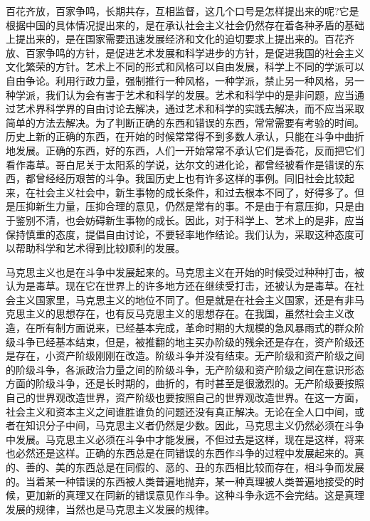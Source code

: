 \documentclass[UTF8, 12pt, a4paper]{ctexrep}
\begin{document}
百花齐放，百家争鸣，长期共存，互相监督，这几个口号是怎样提出来的呢?它是根据中国的具体情况提出来的，是在承认社会主义社会仍然存在着各种矛盾的基础上提出来的，是在国家需要迅速发展经济和文化的迫切要求上提出来的。百花齐放、百家争鸣的方针，是促进艺术发展和科学进步的方针，是促进我国的社会主义文化繁荣的方针。艺术上不同的形式和风格可以自由发展，科学上不同的学派可以自由争论。利用行政力量，强制推行一种风格，一种学派，禁止另一种风格，另一种学派，我们认为会有害于艺术和科学的发展。艺术和科学中的是非问题，应当通过艺术界科学界的自由讨论去解决，通过艺术和科学的实践去解决，而不应当采取简单的方法去解决。为了判断正确的东西和错误的东西，常常需要有考验的时间。历史上新的正确的东西，在开始的时候常常得不到多数人承认，只能在斗争中曲折地发展。正确的东西，好的东西，人们一开始常常不承认它们是香花，反而把它们看作毒草。哥白尼关于太阳系的学说，达尔文的进化论，都曾经被看作是错误的东西，都曾经经历艰苦的斗争。我国历史上也有许多这样的事例。同旧社会比较起来，在社会主义社会中，新生事物的成长条件，和过去根本不同了，好得多了。但是压抑新生力量，压抑合理的意见，仍然是常有的事。不是由于有意压抑，只是由于鉴别不清，也会妨碍新生事物的成长。因此，对于科学上、艺术上的是非，应当保持慎重的态度，提倡自由讨论，不要轻率地作结论。我们认为，采取这种态度可以帮助科学和艺术得到比较顺利的发展。

马克思主义也是在斗争中发展起来的。马克思主义在开始的时候受过种种打击，被认为是毒草。现在它在世界上的许多地方还在继续受打击，还被认为是毒草。在社会主义国家里，马克思主义的地位不同了。但是就是在社会主义国家，还是有非马克思主义的思想存在，也有反马克思主义的思想存在。在我国，虽然社会主义改造，在所有制方面说来，已经基本完成，革命时期的大规模的急风暴雨式的群众阶级斗争已经基本结束，但是，被推翻的地主买办阶级的残余还是存在，资产阶级还是存在，小资产阶级刚刚在改造。阶级斗争并没有结束。无产阶级和资产阶级之间的阶级斗争，各派政治力量之间的阶级斗争，无产阶级和资产阶级之间在意识形态方面的阶级斗争，还是长时期的，曲折的，有时甚至是很激烈的。无产阶级要按照自己的世界观改造世界，资产阶级也要按照自己的世界观改造世界。在这一方面，社会主义和资本主义之间谁胜谁负的问题还没有真正解决。无论在全人口中间，或者在知识分子中间，马克思主义者仍然是少数。因此，马克思主义仍然必须在斗争中发展。马克思主义必须在斗争中才能发展，不但过去是这样，现在是这样，将来也必然还是这样。正确的东西总是在同错误的东西作斗争的过程中发展起来的。真的、善的、美的东西总是在同假的、恶的、丑的东西相比较而存在，相斗争而发展的。当着某一种错误的东西被人类普遍地抛弃，某一种真理被人类普遍地接受的时候，更加新的真理又在同新的错误意见作斗争。这种斗争永远不会完结。这是真理发展的规律，当然也是马克思主义发展的规律。
\end{document}
